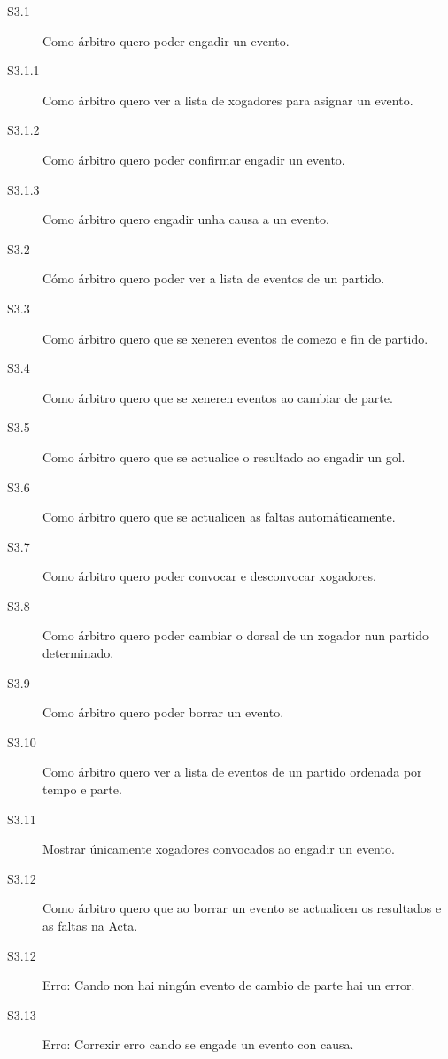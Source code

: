         \begin{description}
          \item [S3.1] Como árbitro quero poder engadir un evento.
          \item [S3.1.1] Como árbitro quero ver a lista de xogadores para 
asignar un evento.
          \item [S3.1.2] Como árbitro quero poder confirmar engadir un evento.
          \item [S3.1.3] Como árbitro quero engadir unha causa a un evento.
          \item [S3.2] Cómo árbitro quero poder ver a lista de eventos de un 
partido.
          \item [S3.3] Como árbitro quero que se xeneren eventos de comezo e 
fin de partido.
          \item [S3.4] Como árbitro quero que se xeneren eventos ao cambiar de 
parte.
          \item [S3.5] Como árbitro quero que se actualice o resultado ao 
engadir un gol.
          \item [S3.6] Como árbitro quero que se actualicen as faltas 
automáticamente.
          \item [S3.7] Como árbitro quero poder convocar e desconvocar 
xogadores.
          \item [S3.8] Como árbitro quero poder cambiar o dorsal de un xogador 
nun partido determinado.
          \item [S3.9] Como árbitro quero poder borrar un evento.
          \item [S3.10] Como árbitro quero ver a lista de eventos de un partido 
ordenada por tempo e parte.
          \item [S3.11] Mostrar únicamente xogadores convocados ao engadir un 
evento.
          \item [S3.12] Como árbitro quero que ao borrar un evento se 
actualicen os 
resultados e as faltas na Acta.
          \item [S3.12] Erro: Cando non hai ningún evento de cambio de parte 
hai un error.
          \item [S3.13] Erro: Correxir erro cando se engade un evento con causa.
        \end{description}

